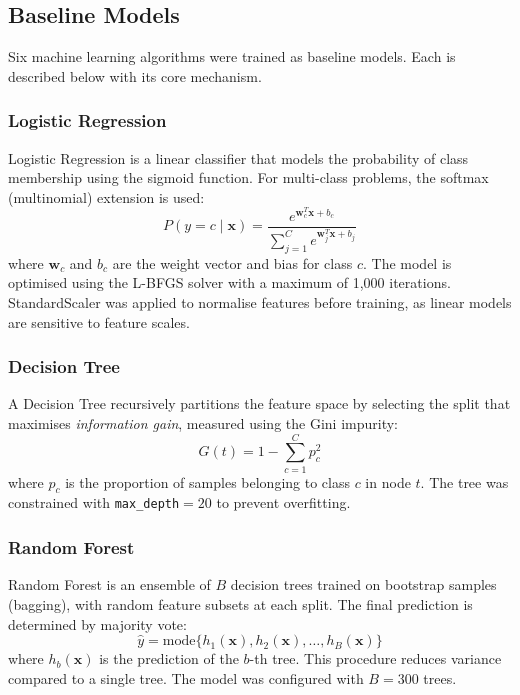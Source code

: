 \documentclass[12pt, a4paper]{article}
\begin{document}
\subsection{Baseline Models}

Six machine learning algorithms were trained as baseline models.
Each is described below with its core mechanism.

\subsubsection{Logistic Regression}
Logistic Regression is a linear classifier that models the probability of class membership using the sigmoid function.
For multi-class problems, the softmax (multinomial) extension is used:
\begin{equation}
    P(y = c \mid \mathbf{x}) = \frac{e^{\mathbf{w}_c^T \mathbf{x} + b_c}}{\sum_{j=1}^{C} e^{\mathbf{w}_j^T \mathbf{x} + b_j}}
\end{equation}
where $\mathbf{w}_c$ and $b_c$ are the weight vector and bias for class $c$.
The model is optimised using the L-BFGS solver with a maximum of 1,000 iterations.
StandardScaler was applied to normalise features before training, as linear models are sensitive to feature scales.

\subsubsection{Decision Tree}
A Decision Tree recursively partitions the feature space by selecting the split that maximises \textit{information gain}, measured using the Gini impurity:
\begin{equation}
    G(t) = 1 - \sum_{c=1}^{C} p_c^2
\end{equation}
where $p_c$ is the proportion of samples belonging to class $c$ in node $t$.
The tree was constrained with \texttt{max\_depth}$=20$ to prevent overfitting.

\subsubsection{Random Forest}
Random Forest is an ensemble of $B$ decision trees trained on bootstrap samples (bagging), with random feature subsets at each split.
The final prediction is determined by majority vote:
\begin{equation}
    \hat{y} = \text{mode}\{h_1(\mathbf{x}), h_2(\mathbf{x}), \dots, h_B(\mathbf{x})\}
\end{equation}
where $h_b(\mathbf{x})$ is the prediction of the $b$-th tree.
This procedure reduces variance compared to a single tree.
The model was configured with $B = 300$ trees.
\end{document}
